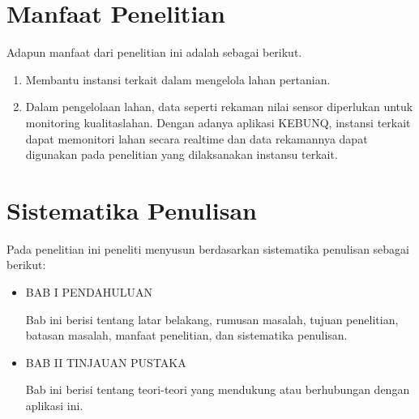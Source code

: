 \begin{flushleft}
\begin{enumerate}
  \end{enumerate}
\vspace{2cm}


\section{Manfaat Penelitian}

\begin{justify}
  Adapun manfaat dari penelitian ini adalah sebagai berikut.


\end{justify}
\begin{enumerate}
  \item Membantu instansi terkait dalam mengelola lahan pertanian.
  \item Dalam pengelolaan lahan, data seperti rekaman nilai sensor diperlukan untuk monitoring kualitaslahan. Dengan adanya aplikasi KEBUNQ, instansi terkait dapat memonitori lahan secara realtime dan data rekamannya dapat digunakan pada penelitian yang dilaksanakan instansu terkait.

  \end{enumerate}
\vspace{2cm}



\section{Sistematika Penulisan}
Pada penelitian ini peneliti menyusun berdasarkan sistematika penulisan sebagai berikut: \\
\begin{itemize}
  \item \noindent BAB I PENDAHULUAN
  \begin{justify}
  Bab ini berisi tentang latar belakang, rumusan masalah, tujuan penelitian, 
  batasan masalah, manfaat penelitian, dan sistematika penulisan.
  \end{justify}
\end{itemize}

\begin{itemize}
  \item \noindent BAB II TINJAUAN PUSTAKA
  \begin{justify}
    Bab ini berisi tentang teori-teori yang mendukung atau berhubungan dengan aplikasi ini.

  \end{justify}
\end{itemize}


\end{flushleft}
